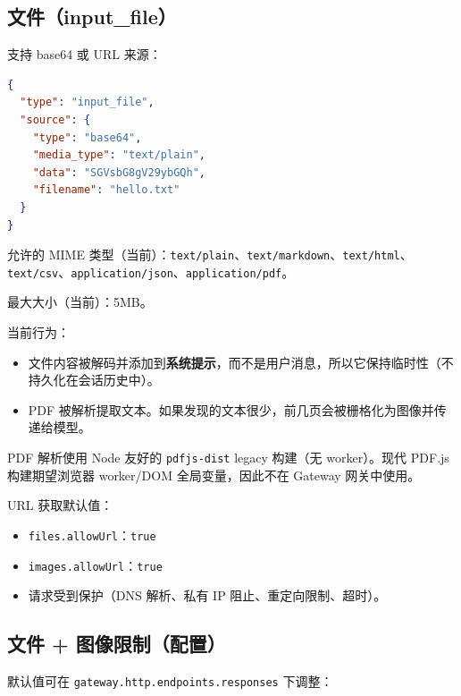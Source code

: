 \subsection{文件（input\_file）}


支持 base64 或 URL 来源：

\begin{lstlisting}[language=json]
{
  "type": "input_file",
  "source": {
    "type": "base64",
    "media_type": "text/plain",
    "data": "SGVsbG8gV29ybGQh",
    "filename": "hello.txt"
  }
}
\end{lstlisting}


允许的 MIME 类型（当前）：\texttt{text/plain}、\texttt{text/markdown}、\texttt{text/html}、\texttt{text/csv}、\texttt{application/json}、\texttt{application/pdf}。

最大大小（当前）：5MB。

当前行为：

\begin{itemize}
  \item 文件内容被解码并添加到\textbf{系统提示}，而不是用户消息，所以它保持临时性（不持久化在会话历史中）。
  \item PDF 被解析提取文本。如果发现的文本很少，前几页会被栅格化为图像并传递给模型。
\end{itemize}


PDF 解析使用 Node 友好的 \texttt{pdfjs-dist} legacy 构建（无 worker）。现代 PDF.js 构建期望浏览器 worker/DOM 全局变量，因此不在 Gateway 网关中使用。

URL 获取默认值：

\begin{itemize}
  \item \texttt{files.allowUrl}：\texttt{true}
  \item \texttt{images.allowUrl}：\texttt{true}
  \item 请求受到保护（DNS 解析、私有 IP 阻止、重定向限制、超时）。
\end{itemize}


\subsection{文件 + 图像限制（配置）}


默认值可在 \texttt{gateway.http.endpoints.responses} 下调整：

